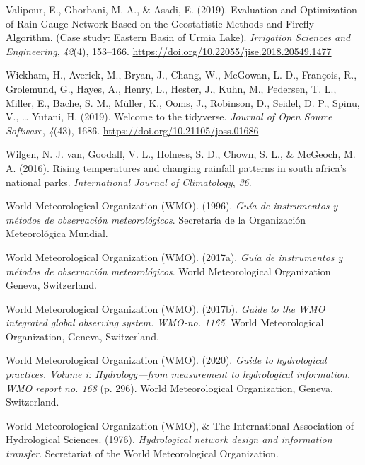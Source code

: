 \documentclass[spanish]{article}
\newlength{\cslhangindent}
\newlength{\cslentryspacingunit} %
\newenvironment{CSLReferences}[2] %
 {%
  \setlength{\parindent}{0pt}
  \ifodd #1
  \let\oldpar\par
  \def\par{\hangindent=\cslhangindent\oldpar}
  \fi
  \setlength{\parskip}{#2\cslentryspacingunit}
 }%
 {}
\begin{document}
\begin{CSLReferences}{1}{0}
\leavevmode{}%
Valipour, E., Ghorbani, M. A., \& Asadi, E. (2019). Evaluation and
Optimization of Rain Gauge Network Based on the Geostatistic Methods and
Firefly Algorithm. (Case study: Eastern Basin of Urmia Lake).
\emph{Irrigation Sciences and Engineering}, \emph{42}(4), 153--166.
\url{https://doi.org/10.22055/jise.2018.20549.1477}

\leavevmode{}%
Wickham, H., Averick, M., Bryan, J., Chang, W., McGowan, L. D.,
François, R., Grolemund, G., Hayes, A., Henry, L., Hester, J., Kuhn, M.,
Pedersen, T. L., Miller, E., Bache, S. M., Müller, K., Ooms, J.,
Robinson, D., Seidel, D. P., Spinu, V., \ldots{} Yutani, H. (2019).
Welcome to the {tidyverse}. \emph{Journal of Open Source Software},
\emph{4}(43), 1686. \url{https://doi.org/10.21105/joss.01686}

\leavevmode{}%
Wilgen, N. J. van, Goodall, V. L., Holness, S. D., Chown, S. L., \&
McGeoch, M. A. (2016). Rising temperatures and changing rainfall
patterns in south africa's national parks. \emph{International Journal
of Climatology}, \emph{36}.

\leavevmode{}%
World Meteorological Organization (WMO). (1996). \emph{Guía de
instrumentos y métodos de observación meteorológicos}. Secretaría de la
Organización Meteorológica Mundial.

\leavevmode{}%
World Meteorological Organization (WMO). (2017a). \emph{Guía de
instrumentos y métodos de observación meteorológicos}. World
Meteorological Organization Geneva, Switzerland.

\leavevmode{}%
World Meteorological Organization (WMO). (2017b). \emph{Guide to the WMO
integrated global observing system. WMO-no. 1165}. World Meteorological
Organization, Geneva, Switzerland.

\leavevmode{}%
World Meteorological Organization (WMO). (2020). \emph{Guide to
hydrological practices. Volume i: Hydrology---from measurement to
hydrological information. WMO report no. 168} (p. 296). World
Meteorological Organization, Geneva, Switzerland.

\leavevmode{}%
World Meteorological Organization (WMO), \& The International
Association of Hydrological Sciences. (1976). \emph{Hydrological network
design and information transfer}. {Secretariat of the World
Meteorological Organization}.


\end{CSLReferences}
\end{document}
